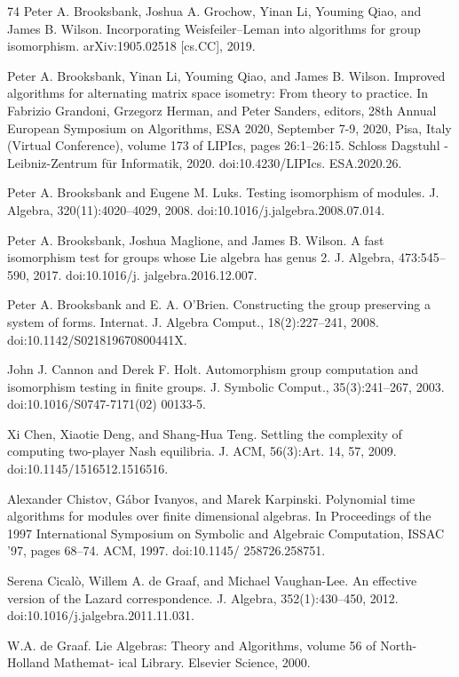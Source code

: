 \documentclass[10pt,a4paper]{article}
\begin{document}
\begin{thebibliography}{74}
Peter A. Brooksbank, Joshua A. Grochow, Yinan Li, Youming Qiao, and James B. Wilson. Incorporating Weisfeiler–Leman into algorithms for group isomorphism. arXiv:1905.02518 [cs.CC], 2019.

Peter A. Brooksbank, Yinan Li, Youming Qiao, and James B. Wilson. Improved algorithms for alternating matrix space isometry: From theory to practice. In Fabrizio Grandoni, Grzegorz Herman, and Peter Sanders, editors, 28th Annual European Symposium on Algorithms, ESA 2020, September 7-9, 2020, Pisa, Italy (Virtual Conference), volume 173 of LIPIcs, pages 26:1–26:15. Schloss Dagstuhl - Leibniz-Zentrum für Informatik, 2020. doi:10.4230/LIPIcs. ESA.2020.26.

Peter A. Brooksbank and Eugene M. Luks. Testing isomorphism of modules. J. Algebra, 320(11):4020–4029, 2008. doi:10.1016/j.jalgebra.2008.07.014.

Peter A. Brooksbank, Joshua Maglione, and James B. Wilson. A fast isomorphism test for groups whose Lie algebra has genus 2. J. Algebra, 473:545–590, 2017. doi:10.1016/j. jalgebra.2016.12.007.

Peter A. Brooksbank and E. A. O’Brien. Constructing the group preserving a system of forms. Internat. J. Algebra Comput., 18(2):227–241, 2008. doi:10.1142/S021819670800441X.

John J. Cannon and Derek F. Holt. Automorphism group computation and isomorphism testing in finite groups. J. Symbolic Comput., 35(3):241–267, 2003. doi:10.1016/S0747-7171(02) 00133-5.

Xi Chen, Xiaotie Deng, and Shang-Hua Teng. Settling the complexity of computing two-player Nash equilibria. J. ACM, 56(3):Art. 14, 57, 2009. doi:10.1145/1516512.1516516.

Alexander Chistov, Gábor Ivanyos, and Marek Karpinski. Polynomial time algorithms for modules over finite dimensional algebras. In Proceedings of the 1997 International Symposium on Symbolic and Algebraic Computation, ISSAC ’97, pages 68–74. ACM, 1997. doi:10.1145/ 258726.258751.

Serena Cicalò, Willem A. de Graaf, and Michael Vaughan-Lee. An effective version of the Lazard correspondence. J. Algebra, 352(1):430–450, 2012. doi:10.1016/j.jalgebra.2011.11.031.

W.A. de Graaf. Lie Algebras: Theory and Algorithms, volume 56 of North-Holland Mathemat- ical Library. Elsevier Science, 2000.


\end{thebibliography}
\end{document}
